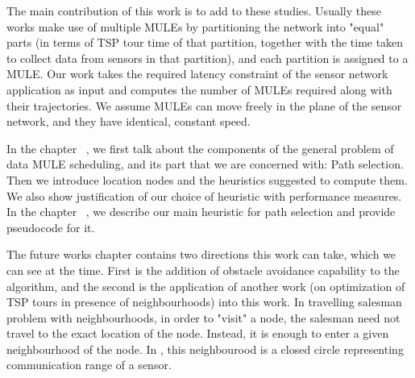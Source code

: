The main contribution of this work is to add to these studies. Usually these works make use of multiple MULEs by partitioning the network into "equal" parts (in terms of TSP tour time of that partition, together with the time taken to collect data from sensors in that partition), and each partition is assigned to a MULE. Our work takes the required latency constraint of the sensor network application as input and computes the number of MULEs required along with their trajectories. We assume MULEs can move freely in the plane of the sensor network, and they have identical, constant speed.

In the chapter ~, we first talk about the components of the general problem of data MULE scheduling, and its part that we are concerned with: Path selection. Then we introduce location nodes and the heuristics suggested to compute them. We also show justification of our choice of heuristic with performance measures. In the chapter ~, we describe our main heuristic for path selection and provide pseudocode for it.

The future works chapter contains two directions this work can take, which we can see at the time. First is the addition of obstacle avoidance capability to the algorithm, and the second is the application of another work (on optimization of TSP tours in presence of neighbourhoods) into this work. In travelling salesman problem with neighbourhoods, in order to "visit" a node, the salesman need not travel to the exact location of the node. Instead, it is enough to enter a given neighbourhood of the node. In \cite{conHull}, this neighbourood is a closed circle representing communication range of a sensor.


